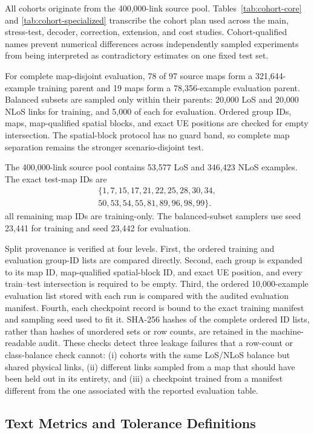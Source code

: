 All cohorts originate from the 400,000-link source pool. Tables~\ref{tab:cohort-core} and
\ref{tab:cohort-specialized} transcribe the cohort plan used across the main, stress-test, decoder,
correction, extension, and cost studies. Cohort-qualified names prevent numerical differences across
independently sampled experiments from being interpreted as contradictory estimates on one fixed
test set.

For complete map-disjoint evaluation, 78 of 97 source maps form a 321,644-example training parent
and 19 maps form a 78,356-example evaluation parent. Balanced subsets are sampled only within
their parents: 20,000 LoS and 20,000 NLoS links for training, and 5,000 of each for evaluation.
Ordered group IDs, maps, map-qualified spatial blocks, and exact UE positions are checked for empty
intersection. The spatial-block protocol has no guard band, so complete map separation remains the
stronger scenario-disjoint test.

The 400,000-link source pool contains 53,577 LoS and 346,423 NLoS examples. The exact test-map
IDs are
\begin{multline*}
\{1,7,15,17,21,22,25,28,30,34,\\
50,53,54,55,81,89,96,98,99\}.
\end{multline*}
all remaining map IDs are training-only. The balanced-subset samplers use seed 23,441 for training
and seed 23,442 for evaluation.

Split provenance is verified at four levels. First, the ordered training and evaluation group-ID lists
are compared directly. Second, each group is expanded to its map ID, map-qualified spatial-block ID,
and exact UE position, and every train--test intersection is required to be empty. Third, the ordered
10,000-example evaluation list stored with each run is compared with the audited evaluation manifest.
Fourth, each checkpoint record is bound to the exact training manifest and sampling seed used to fit
it. SHA-256 hashes of the complete ordered ID lists, rather than hashes of unordered sets or row counts,
are retained in the machine-readable audit. These checks detect three leakage failures that a row-count
or class-balance check cannot: (i) cohorts with the same LoS/NLoS balance but shared physical links,
(ii) different links sampled from a map that should have been held out in its entirety, and (iii) a
checkpoint trained from a manifest different from the one associated with the reported evaluation
table.

\subsection{Text Metrics and Tolerance Definitions}

